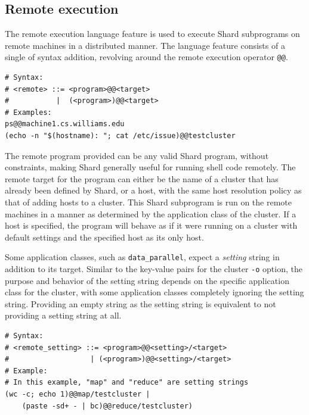 \documentclass[oneside]{report}
\begin{document}
\subsection{Remote execution}
The remote execution language feature is used to execute Shard subprograms on remote machines in a distributed manner.
The language feature consists of a single of syntax addition, revolving around the remote execution operator \texttt{@@}.

\begin{minipage}[c]{\textwidth-15pt}
  \begin{lstlisting}[language=Shard]
# Syntax:
# <remote> ::= <program>@@<target>
#           |  (<program>)@@<target>
# Examples:
ps@@machine1.cs.williams.edu
(echo -n "$(hostname): "; cat /etc/issue)@@testcluster
\end{lstlisting}
  \smallskip
\end{minipage}

The remote program provided can be any valid Shard program, without constraints, making Shard generally useful for running shell code remotely.
The remote target for the program can either be the name of a cluster that has already been defined by Shard, or a host, with the same host resolution policy as that of adding hosts to a cluster.
This Shard subprogram is run on the remote machines in a manner as determined by the application class of the cluster.
If a host is specified, the program will behave as if it were running on a cluster with default settings and the specified host as its only host.

Some application classes, such as \texttt{data\_parallel}, expect a \textit{setting} string in addition to its target.
Similar to the key-value pairs for the cluster \texttt{-o} option, the purpose and behavior of the setting string depends on the specific application class for the cluster, with some application classes completely ignoring the setting string.
Providing an empty string as the setting string is equivalent to not providing a setting string at all.

\begin{minipage}[c]{\textwidth-15pt}
  \begin{lstlisting}[language=Shard]
# Syntax:
# <remote_setting> ::= <program>@@<setting>/<target>
#                   | (<program>)@@<setting>/<target>
# Example:
# In this example, "map" and "reduce" are setting strings
(wc -c; echo 1)@@map/testcluster |
    (paste -sd+ - | bc)@@reduce/testcluster)
\end{lstlisting}
  \smallskip
\end{minipage}
\end{document}
